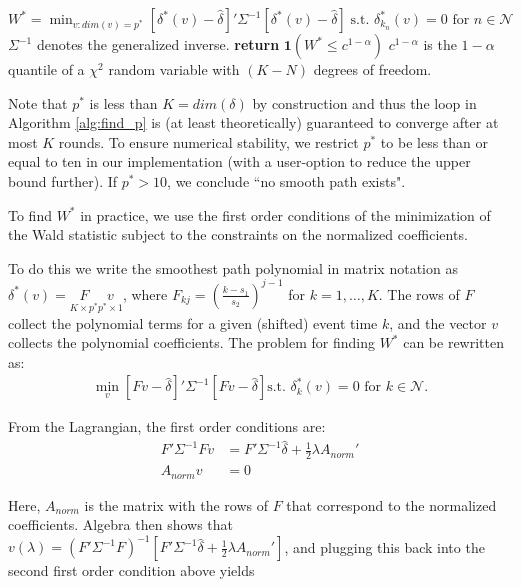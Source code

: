 \documentclass[bib]{./sty/statapress}
\newtheorem{remark}{Remark}
\begin{document}
\begin{algorithm*}
\begin{algorithmic}
\State $W^*=\min_{v:dim(v)=p^*} [\delta^*(v)-\hat{\delta}]'\Sigma^{-1}[\delta^*(v)-\hat{\delta}] \; \text{s.t. } \delta_{k_n}^*(v)=0 \text{ for } n \in \mathcal{N}$
\Comment $\Sigma^{-1}$ denotes the generalized inverse.
\State \textbf{return} $\textbf{1}(W^* \le c^{1-\alpha})$
\Comment $c^{1-\alpha}$ is the $1-\alpha$ quantile of a $\chi^2$ random variable with $(K-N)$ degrees of freedom.
\EndFunction
\end{algorithmic}
\end{algorithm*}
Note that $p^*$ is less than $K=dim(\delta)$ by construction and thus the loop in Algorithm \ref{alg:find_p} is (at least theoretically) guaranteed to converge after at most $K$ rounds. To ensure numerical stability, we restrict $p^*$ to be less than or equal to ten in our implementation (with a user-option to reduce the upper bound further). If $p^{*}>10$, we conclude ``no smooth path exists".

To find $W^*$ in practice, we use the first order conditions of the minimization of the Wald statistic subject to the constraints on the normalized coefficients.

To do this we write the smoothest path polynomial in matrix notation as $\delta^*(v) = \underset{K\times p^*}{F} \underset{p^* \times 1}{v} $, where $F_{kj} = \left(\frac{k-s_1}{s_2}\right)^{j-1}$ for $k=1, \ldots, K$. The rows of $F$ collect the polynomial terms for a given (shifted) event time $k$, and the vector $v$ collects the polynomial coefficients. The problem for finding $W^*$ can be rewritten as:
\begin{align}
\min_v \left[Fv-\hat{\delta}\right]'\Sigma^{-1}\left[Fv-\hat{\delta}\right] \text{s.t. } \delta_{k}^*(v)=0 \text{ for } k \in \mathcal{N}. \label{eq:optimization_W*}
\end{align}

From the Lagrangian, the first order conditions are:
\begin{align*}
F'\Sigma^{-1}F v &=  F' \Sigma^{-1} \hat{\delta} +\frac{1}{2} \lambda A_{norm}'\\
A_{norm} v &= 0
\end{align*}

Here, $A_{norm}$ is the matrix with the rows of $F$ that correspond to the normalized coefficients. Algebra then shows that $v(\lambda)=(F'\Sigma^{-1}F)^{-1}[F' \Sigma^{-1} \hat{\delta} + \frac{1}{2} \lambda A_{norm}']$, and plugging this back into the second first order condition above yields
\end{document}
